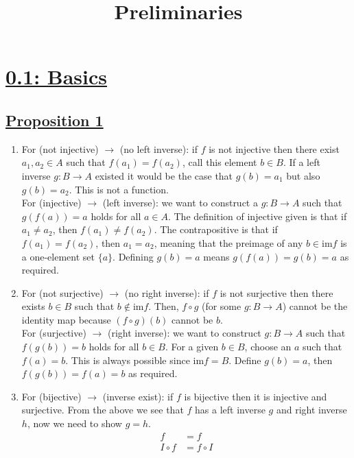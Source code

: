 \documentclass[]{article}
\title{Preliminaries}
\author{}
\date{}
\begin{document}
\maketitle
\vspace{-5em}



\section*{\underline{0.1: Basics}}
\subsection*{\underline{Proposition 1}}
\begin{enumerate}
\item For (not injective) $\rightarrow$ (no left inverse): if $f$ is not injective then there exist $a_1,a_2 \in A$ such that $f(a_1) = f(a_2)$, call this element $b \in B$. If a left inverse $g: B \to A$ existed it would be the case that $g(b) = a_1$ but also $g(b) = a_2$. This is not a function. \\
For (injective) $\rightarrow$ (left inverse): we want to construct a $g:B\to A$ such that $g(f(a)) = a$ holds for all $a \in A$. The definition of injective given is that if $a_1 \neq a_2$, then $f(a_1) \neq f(a_2)$. The contrapositive is that if $f(a_1) = f(a_2)$, then $a_1 = a_2$, meaning that the preimage of any $b \in \text{im}f$ is a one-element set $\{a\}$. Defining $g(b) = a$ means $g(f(a)) = g(b) = a$ as required.
\item For (not surjective) $\rightarrow$ (no right inverse): if $f$ is not surjective then there exists $b \in B$ such that $b \notin \text{im}f$. Then, $f \circ g$ (for some $g: B \to A$) cannot be the identity map because $(f \circ g)(b)$ cannot be $b$. \\ For (surjective) $\rightarrow$ (right inverse): we want to construct $g: B\to A$ such that $f(g(b)) = b$ holds for all $b \in B$. For a given $b \in B$, choose an $a$ such that $f(a) = b$. This is always possible since $\text{im}f = B$. Define $g(b) = a$, then $f(g(b)) = f(a) = b$ as required.
\item For (bijective) $\rightarrow$ (inverse exist): if $f$ is bijective then it is injective and surjective. From the above we see that $f$ has a left inverse $g$ and right inverse $h$, now we need to show $g=h$.
\begin{align}
f &= f \\
I \circ f &= f \circ I \\

\end{align}
\end{enumerate}
\end{document}
